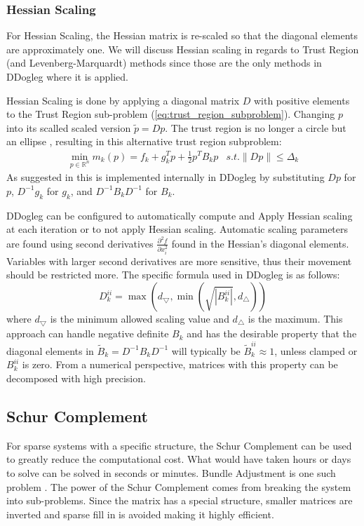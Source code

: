 \documentclass[peerreview,compsoc,onecolumn]{IEEEtran}
\newcommand{\R}{\mathbb{R}}
\newcommand{\norm}[1]{\left\lVert#1\right\rVert}
\begin{document}
\subsubsection{Hessian Scaling}

For Hessian Scaling, the Hessian matrix is re-scaled so that the diagonal elements are approximately one. We will discuss Hessian scaling in regards to Trust Region (and Levenberg-Marquardt) methods since those are the only methods in DDogleg where it is applied.

Hessian Scaling is done by applying a diagonal matrix $D$ with positive elements to the Trust Region sub-problem (\ref{eq:trust_region_subproblem}). Changing $p$ into its scalled scaled version $\tilde{p} = Dp$. The trust region is no longer a circle but an ellipse \cite{numopt2006}, resulting in this alternative trust region subproblem:
\begin{equation}
\begin{array}{lr}
\min\limits_{p\in \R^n} m_k(p) = f_k + g^T_k p + \frac{1}{2}p^T B_k p & s.t. \norm{Dp} \le \Delta_k
\end{array}
\end{equation}
As suggested in \cite{numopt2006} this is implemented internally in DDogleg by substituting $Dp$ for $p$, $D^{-1}g_k$ for $g_k$, and $D^{-1}B_k D^{-1}$ for $B_k$.  

DDogleg can be configured to automatically compute and Apply Hessian scaling at each iteration or to not apply Hessian scaling. Automatic scaling parameters are found using second derivatives $\frac{\partial^2 f}{\partial x^2_i}$ found in the Hessian's diagonal elements. Variables with larger second derivatives are more sensitive, thus their movement should be restricted more. The specific formula used in DDogleg is as follows:
\begin{equation}
D_k^{ii} = \max\left( d_{\bigtriangledown},\min\left( \sqrt{|B_k^{ii}|} , d_{\bigtriangleup} \right)\right)
\end{equation}
where $d_{\bigtriangledown}$ is the minimum allowed scaling value and $d_{\bigtriangleup}$ is the maximum. This approach can handle negative definite $B_k$ and has the desirable property \cite{dennis1996} that the diagonal elements in $\tilde{B}_k = D^{-1}B_k D^{-1}$ will typically be $\tilde{B}_k^{ii} \approx 1$, unless clamped or $B_k^{ii}$ is zero. From a numerical perspective, matrices with this property can be decomposed with high precision. 

\subsection{Schur Complement}
For sparse systems with a specific structure, the Schur Complement can be used to greatly reduce the computational cost. What would have taken hours or days to solve can be solved in seconds or minutes. Bundle Adjustment is one such problem \cite{triggs1999bundle}. The power of the Schur Complement comes from breaking the system into sub-problems. Since the matrix has a special structure, smaller matrices are inverted and sparse fill in \cite{davis2006} is avoided making it highly efficient.
\end{document}
